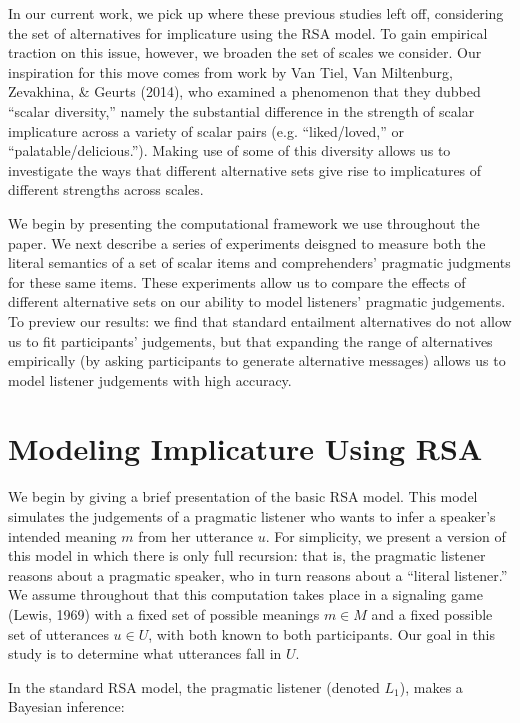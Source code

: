\documentclass[10pt, letterpaper]{article}
\begin{document}
In our current work, we pick up where these previous studies left off,
considering the set of alternatives for implicature using the RSA model.
To gain empirical traction on this issue, however, we broaden the set of
scales we consider. Our inspiration for this move comes from work by Van
Tiel, Van Miltenburg, Zevakhina, \& Geurts (2014), who examined a
phenomenon that they dubbed ``scalar diversity,'' namely the substantial
difference in the strength of scalar implicature across a variety of
scalar pairs (e.g. ``liked/loved,'' or ``palatable/delicious.''). Making
use of some of this diversity allows us to investigate the ways that
different alternative sets give rise to implicatures of different
strengths across scales.

We begin by presenting the computational framework we use throughout the
paper. We next describe a series of experiments deisgned to measure both
the literal semantics of a set of scalar items and comprehenders'
pragmatic judgments for these same items. These experiments allow us to
compare the effects of different alternative sets on our ability to
model listeners' pragmatic judgements. To preview our results: we find
that standard entailment alternatives do not allow us to fit
participants' judgements, but that expanding the range of alternatives
empirically (by asking participants to generate alternative messages)
allows us to model listener judgements with high accuracy.

\section{Modeling Implicature Using
RSA}\label{modeling-implicature-using-rsa}

We begin by giving a brief presentation of the basic RSA model. This
model simulates the judgements of a pragmatic listener who wants to
infer a speaker's intended meaning \(m\) from her utterance \(u\). For
simplicity, we present a version of this model in which there is only
full recursion: that is, the pragmatic listener reasons about a
pragmatic speaker, who in turn reasons about a ``literal listener.'' We
assume throughout that this computation takes place in a signaling game
(Lewis, 1969) with a fixed set of possible meanings \(m \in M\) and a
fixed possible set of utterances \(u \in U\), with both known to both
participants. Our goal in this study is to determine what utterances
fall in \(U\).

In the standard RSA model, the pragmatic listener (denoted \(L_1\)),
makes a Bayesian inference:
\end{document}
